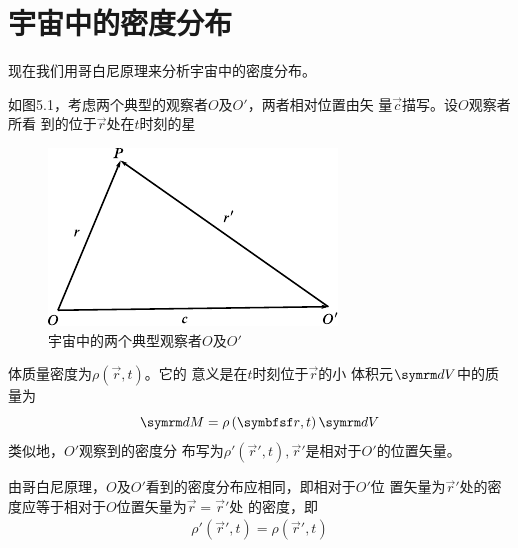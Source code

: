 \section{宇宙中的密度分布}\label{sec:05.02}

现在我们用哥白尼原理来分析宇宙中的密度分布。

如图5.1，考虑两个典型的观察者$ O $及$  O'   $，两者相对位置由矢
量$ \vec{c} $描写。设$ O $观察者所看
到的位于$ \vec{r} $处在$ t $时刻的星
\begin{figure}
  \centering
  \includegraphics{figure/fig05.01}
  \caption{宇宙中的两个典型观察者$ O $及$ O' $}
  \label{fig:05.01}
\end{figure}
体质量密度为$  \rho \left( \vec{r} , t \right)   $。它的
意义是在$ t $时刻位于$ \vec{r} $的小
体积元$ \dif V $中的质量为
{\setlength\mathindent{3em}
\begin{equation*}
  \dif M = \rho \left( \vec{r} , t \right) \dif V
\end{equation*}}
类似地，$ O' $观察到的密度分
布写为$  \rho ' \left( \vec{r} ' , t \right)   , \vec{r} ' $是相对于$ O' $的位置矢量。

由哥白尼原理，$ O $及$ O' $看到的密度分布应相同，即相对于$ O' $位
置矢量为$ \vec{r} ' $处的密度应等于相对于$ O $位置矢量为$ \vec{r} = \vec{r} ' $处
的密度，即\vspace{-1.5em}
\begin{align}\label{eqn:05.02.01}
  \rho ' \left( \vec{r} ' , t \right) = \rho \left( \vec{r} ' , t \right)
\end{align}

